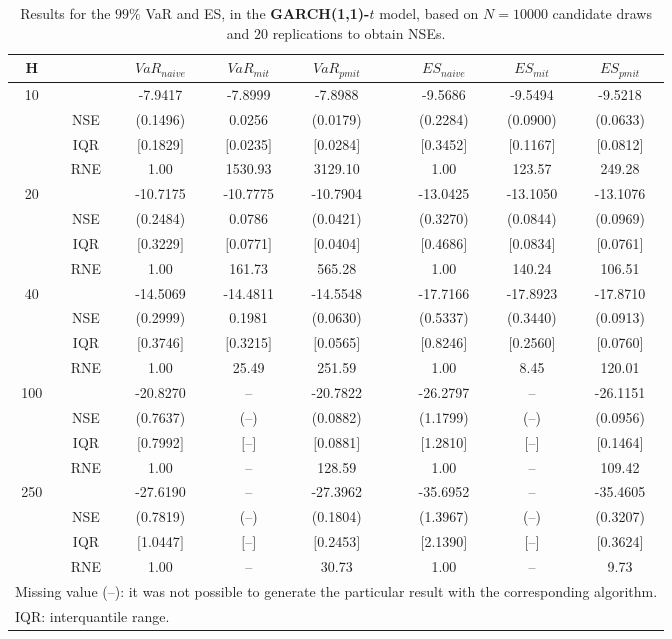 \footnotesize{  
{ \renewcommand{\arraystretch}{1.3} 
\begin{longtable}{ccccccccc}  
\caption{Results for the $99\%$ VaR and ES, in the \textbf{GARCH(1,1)-$t$} model, based on $N=10000$ candidate draws and $20$ replications to obtain NSEs.} 
\label{tab:res_algos_t_garch2_noS_ML} \\ 
 H & & $VaR_{naive}$ & $VaR_{mit}$ & $VaR_{pmit}$ &  & $ES_{naive}$ & $ES_{mit}$ & $ES_{pmit}$ \\ \hline 
10 & & -7.9417 & -7.8999 & -7.8988 & & -9.5686 & -9.5494 & -9.5218  \\ 
  & NSE & (0.1496) & 0.0256 & (0.0179) & & (0.2284) & (0.0900) & (0.0633)   \\ 
 & IQR & $[$0.1829$]$ & $[$0.0235$]$ & $[$0.0284$]$ & & $[$0.3452$]$ & $[$0.1167$]$ & $[$0.0812$]$  \\  
  & RNE &   1.00 & 1530.93 & 3129.10 & &   1.00 & 123.57 & 249.28   \\ [1ex] 
20 & & -10.7175 & -10.7775 & -10.7904 & & -13.0425 & -13.1050 & -13.1076  \\ 
  & NSE & (0.2484) & 0.0786 & (0.0421) & & (0.3270) & (0.0844) & (0.0969)   \\ 
 & IQR & $[$0.3229$]$ & $[$0.0771$]$ & $[$0.0404$]$ & & $[$0.4686$]$ & $[$0.0834$]$ & $[$0.0761$]$  \\  
  & RNE &   1.00 & 161.73 & 565.28 & &   1.00 & 140.24 & 106.51   \\ [1ex] 
40 & & -14.5069 & -14.4811 & -14.5548 & & -17.7166 & -17.8923 & -17.8710  \\ 
  & NSE & (0.2999) & 0.1981 & (0.0630) & & (0.5337) & (0.3440) & (0.0913)   \\ 
 & IQR & $[$0.3746$]$ & $[$0.3215$]$ & $[$0.0565$]$ & & $[$0.8246$]$ & $[$0.2560$]$ & $[$0.0760$]$  \\  
  & RNE &   1.00 &  25.49 & 251.59 & &   1.00 &   8.45 & 120.01   \\ [1ex] 
100 & & -20.8270 & -- & -20.7822 & & -26.2797 & -- & -26.1151  \\ 
  & NSE & (0.7637) & (--) & (0.0882) & & (1.1799) & (--) & (0.0956)   \\ 
 & IQR & $[$0.7992$]$ & $[$--$]$& $[$0.0881$]$ & & $[$1.2810$]$ & $[$--$]$& $[$0.1464$]$  \\  
  & RNE &   1.00 & -- & 128.59 & &   1.00 & -- & 109.42   \\ [1ex] 
250 & & -27.6190 & -- & -27.3962 & & -35.6952 & -- & -35.4605  \\ 
  & NSE & (0.7819) & (--) & (0.1804) & & (1.3967) & (--) & (0.3207)   \\ 
 & IQR & $[$1.0447$]$ & $[$--$]$& $[$0.2453$]$ & & $[$2.1390$]$ & $[$--$]$& $[$0.3624$]$  \\  
  & RNE &   1.00 & -- &  30.73 & &   1.00 & -- &   9.73   \\ [1ex] 
\hline 
  \multicolumn{9}{p{10cm}}{\footnotesize{Missing value (--): it was not possible to generate the particular result with the corresponding algorithm.}} \\ 
  \multicolumn{9}{l}{\footnotesize{IQR: interquantile range.}} \\ 
\end{longtable} 
} 
} 
